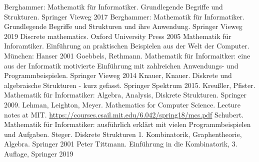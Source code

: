 \begin{thebibliography}{AAA}
		 Berghammer: Mathematik für Informatiker. Grundlegende Begriffe und Strukturen. Springer Vieweg 2017
		 Berghammer: Mathematik für Informatiker. Grundlegende Begriffe und Strukturen und ihre Anwendung. Springer Vieweg 2019
		 Discrete mathematics. Oxford University Press 2005
		 Mathematik für Inforamtiker. Einführung an praktischen Beispielen aus der Welt der Computer. München: Hanser 2001
		 Goebbels, Rethmann. Mathematik für Informaitker: eine aus der Informatik motivierte Einführung mit zahlreichen Anwendungs- und Programmbeispielen. Springer Vieweg 2014
		 Knauer, Knauer. Diskrete und algebraische Strukturen - kurz gefasst. Springer Spektrum 2015. 
		 Kreußler, Pfister. Mathematik für Informatiker: Algebra, Analysis, Diskrete Strukturen. Springer 2009. 
		 Lehman, Leighton, Meyer. Mathematics for Computer Science. Lecture notes at MIT. \url{https://courses.csail.mit.edu/6.042/spring18/mcs.pdf} 
		 Schubert. Mathematik für Informatiker: ausführlich erklärt mit vielen Programmbeispielen und Aufgaben.  
		 Steger. Diskrete Strukturen 1. Kombinatorik, Graphentheorie, Algebra. Springer 2001
		 Peter Tittmann. Einführung in die Kombinatorik, 3. Auflage, Springer 2019
\end{thebibliography} 





%
%

